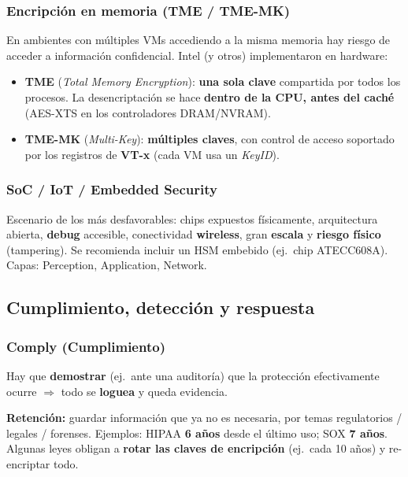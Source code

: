 \documentclass[../main.tex]{subfiles}
\begin{document}
\subsubsection{Encripción en memoria (TME / TME-MK)}
En ambientes con múltiples VMs accediendo a la misma memoria hay riesgo de acceder a
información confidencial. Intel (y otros) implementaron en hardware:
\begin{itemize}[nosep]
  \item \textbf{TME} (\emph{Total Memory Encryption}): \textbf{una sola clave} compartida
        por todos los procesos. La desencriptación se hace \textbf{dentro de la CPU,
        antes del caché} (AES-XTS en los controladores DRAM/NVRAM).
  \item \textbf{TME-MK} (\emph{Multi-Key}): \textbf{múltiples claves}, con control de
        acceso soportado por los registros de \textbf{VT-x} (cada VM usa un \emph{KeyID}).
\end{itemize}

\subsubsection{SoC / IoT / Embedded Security}
Escenario de los más desfavorables: chips expuestos físicamente, arquitectura abierta,
\textbf{debug} accesible, conectividad \textbf{wireless}, gran \textbf{escala} y
\textbf{riesgo físico} (tampering). Se recomienda incluir un HSM embebido (ej.\ chip
ATECC608A). Capas: Perception, Application, Network.

\subsection{Cumplimiento, detección y respuesta}

\subsubsection{Comply (Cumplimiento)}
Hay que \textbf{demostrar} (ej.\ ante una auditoría) que la protección efectivamente
ocurre $\Rightarrow$ todo se \textbf{loguea} y queda evidencia.

\textbf{Retención:} guardar información que ya no es necesaria, por temas regulatorios /
legales / forenses. Ejemplos: HIPAA \textbf{6 años} desde el último uso; SOX \textbf{7
años}. Algunas leyes obligan a \textbf{rotar las claves de encripción} (ej.\ cada 10
años) y re-encriptar todo.
\end{document}
